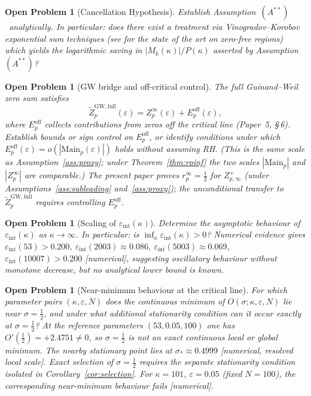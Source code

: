 \documentclass[11pt]{article}
\newtheorem{openproblem}[theorem]{Open Problem}
\newcommand{\Astar}{\ensuremath{(A^{**})}}  %
\begin{document}
\begin{openproblem}[Cancellation Hypothesis]
\label{op:cancel}
Establish Assumption~\Astar\ analytically.
In particular: does there exist a treatment via Vinogradov--Korobov
exponential sum techniques
(see \cite{MossinghoffTrudgianYang24,Bellotti24a} for the
state of the art on zero-free regions) which yields the logarithmic
saving in $|M_k(\kappa)|/P(\kappa)$ asserted by Assumption~\Astar?
\end{openproblem}

\begin{openproblem}[GW bridge and off-critical control]
\label{op:gwbridge}
The full Guinand--Weil zero sum satisfies
\[
\widetilde Z_p^{\mathrm{GW,full}}(\varepsilon)
= Z_p^\infty(\varepsilon) + E_p^{\mathrm{off}}(\varepsilon),
\]
where $E_p^{\mathrm{off}}$ collects contributions from zeros
off the critical line (Paper~5, \S\,6).
Establish bounds or sign control on $E_p^{\mathrm{off}}$,
or identify conditions under which
$E_p^{\mathrm{off}}(\varepsilon)=o(|\mathrm{Main}_p(\varepsilon)|)$
holds without assuming RH.
(This is the same scale as Assumption~\ref{ass:proxy};
under Theorem~\ref{thm:rpinf} the two scales
$|\mathrm{Main}_p|$ and $|Z_p^\infty|$ are comparable.)
The present paper proves $r_p^\infty=\tfrac12$ for $Z_{p,\infty}^+$
(under Assumptions~\ref{ass:subleading} and~\ref{ass:proxy});
the unconditional transfer to $\widetilde Z_p^{\mathrm{GW,full}}$
requires controlling $E_p^{\mathrm{off}}$.
\end{openproblem}

\begin{openproblem}[Scaling of $\varepsilon_{\mathrm{int}}(\kappa)$]
\label{op:epsc}
Determine the asymptotic behaviour of $\varepsilon_{\mathrm{int}}(\kappa)$ as $\kappa\to\infty$.
In particular: is $\inf_\kappa\varepsilon_{\mathrm{int}}(\kappa)>0$?
Numerical evidence gives $\varepsilon_{\mathrm{int}}(53)>0.200$, $\varepsilon_{\mathrm{int}}(2003)\approx 0.086$,
$\varepsilon_{\mathrm{int}}(5003)\approx 0.069$, $\varepsilon_{\mathrm{int}}(10007)>0.200$ [numerical],
suggesting oscillatory behaviour without monotone decrease, but no
analytical lower bound is known.
\end{openproblem}

\begin{openproblem}[Near-minimum behaviour at the critical line]
\label{op:global}
For which parameter pairs $(\kappa,\varepsilon,N)$ does the continuous
minimum of $O(\sigma;\kappa,\varepsilon,N)$ lie near $\sigma=\tfrac12$,
and under what additional stationarity condition can it occur exactly
at $\sigma=\tfrac12$?
At the reference parameters $(53,0.05,100)$ one has
$O'(\tfrac12)=+2.4751\ne 0$, so $\sigma=\tfrac12$ is not an exact
continuous local or global minimum.
The nearby stationary point lies at
$\sigma_*\approx 0.4999$ [numerical, resolved local scale].
Exact selection of $\sigma=\tfrac12$ requires the separate stationarity
condition isolated in Corollary~\ref{cor:selection}.
For $\kappa=101$, $\varepsilon=0.05$ (fixed $N=100$), the corresponding
near-minimum behaviour fails [numerical].
\end{openproblem}
\end{document}
